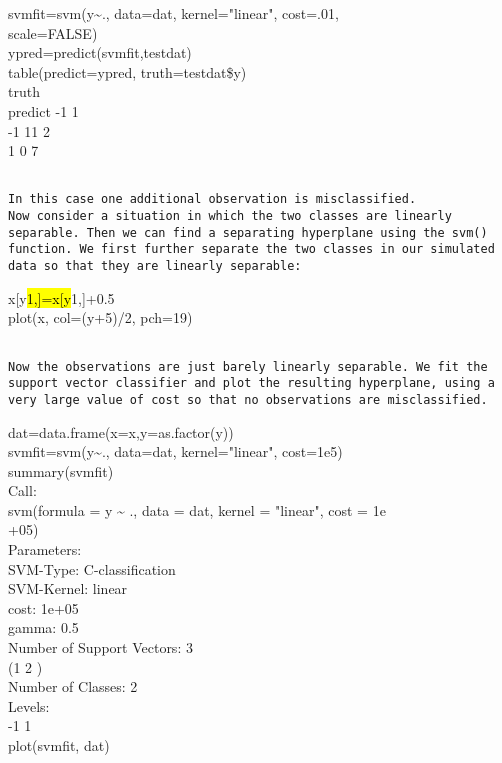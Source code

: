 \documentclass[10pt]{article}
\begin{document}
\begin{displayquote}
svmfit=svm(y\~{}., data=dat, kernel="linear", cost=.01,\\
scale=FALSE)\\
ypred=predict(svmfit,testdat)\\
table(predict=ypred, truth=testdat\$y)\\
truth\\
predict -1 1\\
-1 11 2\\
1 0 7
\end{displayquote}

\begin{verbatim}

In this case one additional observation is misclassified.
Now consider a situation in which the two classes are linearly separable. Then we can find a separating hyperplane using the svm() function. We first further separate the two classes in our simulated data so that they are linearly separable:
\end{verbatim}

\begin{displayquote}
x[y\hl{1,]=x[y}1,]+0.5\\
plot(x, col=(y+5)/2, pch=19)
\end{displayquote}

\begin{verbatim}

Now the observations are just barely linearly separable. We fit the support vector classifier and plot the resulting hyperplane, using a very large value of cost so that no observations are misclassified.
\end{verbatim}

\begin{displayquote}
dat=data.frame(x=x,y=as.factor(y))\\
svmfit=svm(y\~{}., data=dat, kernel="linear", cost=1e5)\\
summary(svmfit)\\
Call:\\
svm(formula = y \~{} ., data = dat, kernel = "linear", cost = 1e\\
+05)\\
Parameters:\\
SVM-Type: C-classification\\
SVM-Kernel: linear\\
cost: 1e+05\\
gamma: 0.5\\
Number of Support Vectors: 3\\
(1 2 )\\
Number of Classes: 2\\
Levels:\\
-1 1\\
plot(svmfit, dat)
\end{displayquote}
\end{document}

